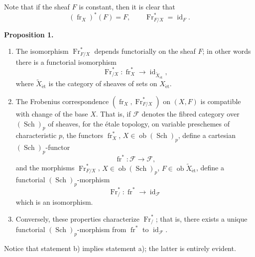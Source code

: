 \documentclass[11pt]{article}
\newenvironment{statement}[1]{\par\medskip\noindent\textbf{#1.}\ }{\par\medskip}
\providecommand{\et}{\mathrm{\acute{e}t}}
\providecommand{\id}{\operatorname{id}}
\providecommand{\Ob}{\operatorname{ob}}
\providecommand{\id}{\operatorname{id}}
\providecommand{\id}{\operatorname{id}}
\providecommand{\Ob}{\operatorname{ob}}
\providecommand{\id}{\operatorname{id}}
\providecommand{\id}{\operatorname{id}}
\providecommand{\Ob}{\operatorname{Ob}}
\providecommand{\Ob}{\operatorname{ob}}
\providecommand{\fr}{\operatorname{fr}}
\providecommand{\Fr}{\operatorname{Fr}}
\providecommand{\Sch}{\operatorname{Sch}}
\providecommand{\Fr}{\operatorname{Fr}}
\providecommand{\fr}{\operatorname{fr}}
\providecommand{\Sch}{\operatorname{Sch}}
\providecommand{\id}{\operatorname{id}}
\providecommand{\Ob}{\operatorname{Ob}}
\providecommand{\et}{\acute{e}t}
\begin{document}
Note that if the sheaf $F$ is constant, then it is clear that
\[
(\fr_X)^*(F)=F,
\qquad
\Fr^*_{F/X}=\id_F.
\]

\label{sga5:XV:proposition:1:2}\begin{statement}{Proposition 1}
\begin{enumerate}[label=\alph*)]
\item The isomorphism $\Fr^*_{F/X}$ depends functorially on the sheaf $F$; in other words there is a functorial isomorphism
\[
\Fr^*_{/X}:\fr_X^*\longrightarrow \id_{\widetilde X_{\et}},
\]
where $\widetilde X_{\et}$ is the category of sheaves of sets on $X_{\et}$.
\item The Frobenius correspondence $(\fr_X,\Fr^*_{F/X})$ on $(X,F)$ is compatible with change of the base $X$. That is, if $\mathcal F$ denotes the fibred category over $(\Sch)_p$ of sheaves, for the étale topology, on variable preschemes of characteristic $p$, the functors $\fr_X^*$, $X\in\Ob(\Sch)_p$, define a cartesian $(\Sch)_p$-functor
\[
\fr^*: \mathcal F\longrightarrow\mathcal F,
\]
and the morphisms $\Fr^*_{F/X}$, $X\in\Ob(\Sch)_p$, $F\in\Ob\widetilde X_{\et}$, define a functorial $(\Sch)_p$-morphism
\[
\Fr^*_{/}:\fr^*\longrightarrow\id_{\mathcal F}
\]
which is an isomorphism.
\item Conversely, these properties characterize $\Fr^*_{/}$; that is, there exists a unique functorial $(\Sch)_p$-morphism from $\fr^*$ to $\id_{\mathcal F}$.
\end{enumerate}
\end{statement}

Notice that statement b) implies statement a); the latter is entirely evident.
\end{document}
